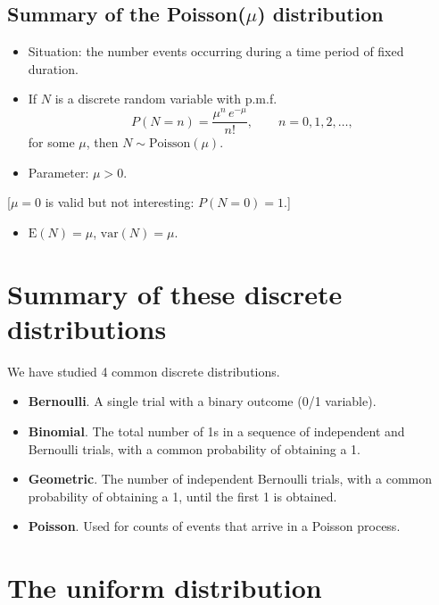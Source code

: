 \documentclass[
  british,
  11pt,
  openany, a4paper]{book}
\providecommand{\tightlist}{%
  \setlength{\itemsep}{0pt}\setlength{\parskip}{0pt}}
\begin{document}
\subsection{\texorpdfstring{Summary of the Poisson(\(\mu\)) distribution}{Summary of the Poisson(\textbackslash mu) distribution}}\label{summary-of-the-poissonmu-distribution}

\begin{itemize}
\tightlist
\item
  Situation: the number events occurring during a time period of fixed duration.
\item
  If \(N\) is a discrete random variable with p.m.f.
  \[ P(N=n) = \frac{\mu^n\, e^{-\mu}}{n!}, \qquad n=0,1,2,\ldots, \]
  for some \(\mu\), then \(N \sim \text{Poisson}(\mu)\).
\item
  Parameter: \(\mu > 0\).
\end{itemize}

{[}\(\mu = 0\) is valid but not interesting: \(P(N = 0) = 1\).{]}

\begin{itemize}
\tightlist
\item
  \(\text{E}(N)=\mu\), \(\text{var}(N)=\mu\).
\end{itemize}

\section{Summary of these discrete distributions}\label{summary-of-these-discrete-distributions}

We have studied 4 common discrete distributions.

\begin{itemize}
\tightlist
\item
  \textbf{Bernoulli}. A single trial with a binary outcome (0/1 variable).
\item
  \textbf{Binomial}. The total number of 1s in a sequence of independent and Bernoulli trials, with a common probability of obtaining a 1.\\
\item
  \textbf{Geometric}. The number of independent Bernoulli trials, with a common probability of obtaining a 1, until the first 1 is obtained.
\item
  \textbf{Poisson}. Used for counts of events that arrive in a Poisson process.
\end{itemize}

\section{The uniform distribution}\label{uniform}
\end{document}
